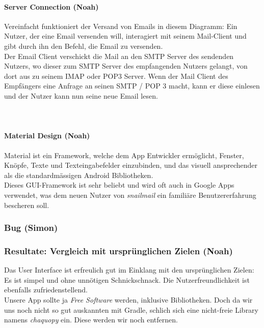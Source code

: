 \documentclass[a4paper,10pt]{scrartcl}
\begin{document}
\begin{multicols}{3}
\paragraph{Server Connection (Noah)}

Vereinfacht funktioniert der Versand von Emails in diesem Diagramm: Ein
Nutzer, der eine Email versenden will, interagiert mit seinem
Mail-Client und gibt durch ihn den Befehl, die Email zu versenden.\\

Der
Email Client verschickt die Mail an den SMTP Server des sendenden
Nutzers, wo dieser zum SMTP Server des empfangenden Nutzers gelangt, von
dort aus zu seinem IMAP oder POP3 Server. Wenn der Mail Client des
Empfängers eine Anfrage an seinen SMTP / POP 3 macht, kann er diese
einlesen und der Nutzer kann nun seine neue Email lesen.\\\\\\

\paragraph{Material Design (Noah)}

Material ist ein Framework, welche dem App Entwickler ermöglicht,
Fenster, Knöpfe, Texte und Texteingabefelder einzubinden, und das
visuell ansprechender als die standardmässigen Android Bibliotheken.\\

Dieses GUI-Framework ist sehr beliebt und wird oft auch in Google Apps
verwendet, was dem neuen Nutzer von \emph{snailmail} ein familiäre
Benutzererfahrung bescheren soll.

\subsubsection*{Bug (Simon)}

\subsubsection*{Resultate: Vergleich mit ursprünglichen Zielen (Noah)}

Das User Interface ist erfreulich gut im Einklang mit den ursprünglichen
Zielen: Es ist simpel und ohne unnötigen Schnickschnack. Die
Nutzerfreundlichkeit ist ebenfalls zufriedenstellend.\\

Unsere App sollte ja \emph{Free Software} werden, inklusive
Bibliotheken. Doch da wir uns noch nicht so gut auskannten mit Gradle,
schlich sich eine nicht-freie Library namens \emph{chaquopy} ein. Diese
werden wir noch entfernen.\\


\end{multicols}
\end{document}
